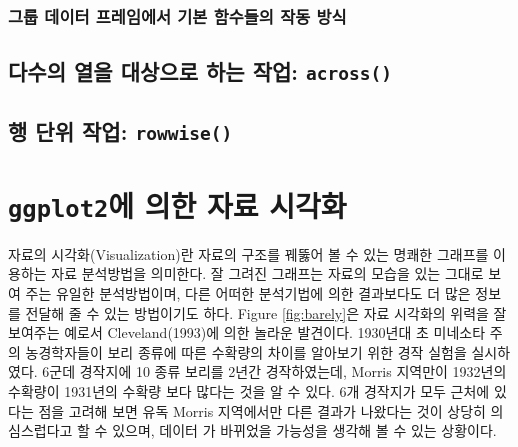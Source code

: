 \documentclass[
]{book}
\begin{document}
\hypertarget{uxadf8uxb8f9-uxb370uxc774uxd130-uxd504uxb808uxc784uxc5d0uxc11c-uxae30uxbcf8-uxd568uxc218uxb4e4uxc758-uxc791uxb3d9-uxbc29uxc2dd}{%
\subsection{그룹 데이터 프레임에서 기본 함수들의 작동 방식}\label{uxadf8uxb8f9-uxb370uxc774uxd130-uxd504uxb808uxc784uxc5d0uxc11c-uxae30uxbcf8-uxd568uxc218uxb4e4uxc758-uxc791uxb3d9-uxbc29uxc2dd}}

\hypertarget{uxb2e4uxc218uxc758-uxc5f4uxc744-uxb300uxc0c1uxc73cuxb85c-uxd558uxb294-uxc791uxc5c5-across}{%
\section{\texorpdfstring{다수의 열을 대상으로 하는 작업: \texttt{across()}}{다수의 열을 대상으로 하는 작업: across()}}\label{uxb2e4uxc218uxc758-uxc5f4uxc744-uxb300uxc0c1uxc73cuxb85c-uxd558uxb294-uxc791uxc5c5-across}}

\hypertarget{uxd589-uxb2e8uxc704-uxc791uxc5c5-rowwise}{%
\section{\texorpdfstring{행 단위 작업: \texttt{rowwise()}}{행 단위 작업: rowwise()}}\label{uxd589-uxb2e8uxc704-uxc791uxc5c5-rowwise}}

\hypertarget{chapter-ggplot2}{%
\chapter{\texorpdfstring{\texttt{ggplot2}에 의한 자료 시각화}{ggplot2에 의한 자료 시각화}}\label{chapter-ggplot2}}

자료의 시각화(Visualization)란 자료의 구조를 꿰뚫어 볼 수 있는 명쾌한 그래프를 이용하는 자료 분석방법을 의미한다.
잘 그려진 그래프는 자료의 모습을 있는 그대로 보여 주는 유일한 분석방법이며,
다른 어떠한 분석기법에 의한 결과보다도 더 많은 정보를 전달해 줄 수 있는 방법이기도 하다.
Figure \ref{fig:barely}은 자료 시각화의 위력을 잘 보여주는 예로서 Cleveland(1993)에 의한 놀라운 발견이다.
1930년대 초 미네소타 주의 농경학자들이 보리 종류에 따른 수확량의 차이를 알아보기 위한 경작 실험을 실시하였다.
6군데 경작지에 10 종류 보리를 2년간 경작하였는데, Morris 지역만이 1932년의 수확량이 1931년의 수확량
보다 많다는 것을 알 수 있다. 6개 경작지가 모두 근처에 있다는 점을 고려해 보면 유독
Morris 지역에서만 다른 결과가 나왔다는 것이 상당히 의심스럽다고 할 수 있으며, 데이터
가 바뀌었을 가능성을 생각해 볼 수 있는 상황이다.
\end{document}
